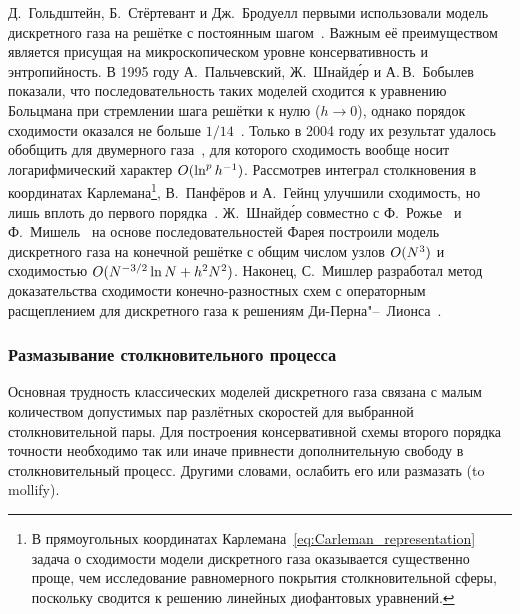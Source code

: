Д.~Гольдштейн, Б.~Стёртевант и Дж.~Бродуелл первыми использовали модель дискретного газа
на решётке с постоянным шагом~\cite{Goldstein1989}.
Важным её преимуществом является присущая на микроскопическом уровне консервативность и энтропийность.
В 1995 году А.~Пальчевский, Ж.~Шнайд\'{е}р и А.\,В.~Бобылев показали,
что последовательность таких моделей сходится к уравнению Больцмана при стремлении шага решётки к нулю (\(h\to0\)),
однако порядок сходимости оказался не больше \(1/14\)~\cite{Palczewski1995, Palczewski1997}.
Только в 2004 году их результат удалось обобщить для двумерного газа~\cite{Fainsilber2006},
для которого сходимость вообще носит логарифмический характер \(O(\ln^p h^{-1})\).
Рассмотрев интеграл столкновения в координатах Карлемана\footnote{
    В прямоугольных координатах Карлемана~\eqref{eq:Carleman_representation} задача о сходимости
    модели дискретного газа оказывается существенно проще, чем исследование равномерного покрытия
    столкновительной сферы, поскольку сводится к решению линейных диофантовых уравнений.
}, В.~Панфёров и А.~Гейнц улучшили сходимость,
но лишь вплоть до первого порядка~\cite{Panferov2002}.
Ж.~Шнайд\'{е}р совместно с Ф.~Рожье~\cite{Rogier1994} и Ф.~Мишель~\cite{Michel2000}
на основе последовательностей Фарея построили модель дискретного газа на конечной решётке
с общим числом узлов \(O(N^3)\) и сходимостью \(O(N^{-3/2}\ln{N} + h^2N^2)\).
Наконец, С.~Мишлер разработал метод доказательства сходимости конечно-разностных схем
с операторным расщеплением для дискретного газа к решениям Ди-Перна"--~Лионса~\cite{Mischler1997}.

\subsubsection{Размазывание столкновительного процесса}

Основная трудность классических моделей дискретного газа связана с малым количеством
допустимых пар разлётных скоростей для выбранной столкновительной пары.
Для построения консервативной схемы второго порядка точности необходимо так или иначе
привнести дополнительную свободу в столкновительный процесс.
Другими словами, ослабить его или размазать (to mollify).

